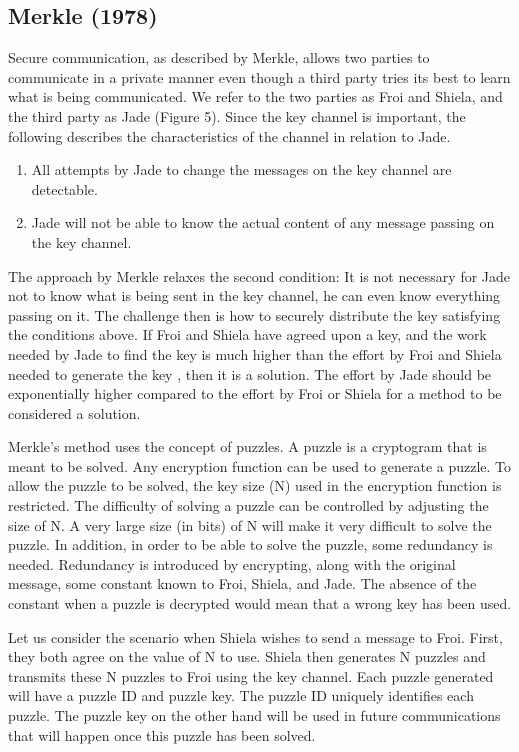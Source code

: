 \documentclass{article}
\begin{document}
\subsection{Merkle (1978)}

Secure communication, as described by Merkle\cite{merkle_secure_1978},
allows two parties to communicate in a private manner even though
a third party tries its best to learn what is being communicated.
We refer to the two parties as Froi and Shiela, and the third party
as Jade (Figure 5). Since the key channel is important, the following
describes the characteristics of the channel in relation to Jade.
\begin{enumerate}
\item All attempts by Jade to change the messages on the key channel are
detectable.
\item Jade will not be able to know the actual content of any message passing
on the key channel.
\end{enumerate}
The approach by Merkle relaxes the second condition: It is not necessary
for Jade not to know what is being sent in the key channel, he can
even know everything passing on it. The challenge then is how to securely
distribute the key satisfying the conditions above. If Froi and Shiela
have agreed upon a key, and the work needed by Jade to find the key
is much higher than the effort by Froi and Shiela needed to generate
the key , then it is a solution. The effort by Jade should be exponentially
higher compared to the effort by Froi or Shiela for a method to be
considered a solution. 

Merkle's method uses the concept of puzzles\cite{merkle_secure_1978}.
A puzzle is a cryptogram that is meant to be solved. Any encryption
function can be used to generate a puzzle. To allow the puzzle to
be solved, the key size (N) used in the encryption function is restricted.
The difficulty of solving a puzzle can be controlled by adjusting
the size of N. A very large size (in bits) of N will make it very
difficult to solve the puzzle. In addition, in order to be able to
solve the puzzle, some redundancy is needed. Redundancy is introduced
by encrypting, along with the original message, some constant known
to Froi, Shiela, and Jade. The absence of the constant when a puzzle
is decrypted would mean that a wrong key has been used. 

Let us consider the scenario when Shiela wishes to send a message
to Froi. First, they both agree on the value of N to use. Shiela then
generates N puzzles and transmits these N puzzles to Froi using the
key channel. Each puzzle generated will have a puzzle ID and puzzle
key. The puzzle ID uniquely identifies each puzzle. The puzzle key
on the other hand will be used in future communications that will
happen once this puzzle has been solved. 
\end{document}

